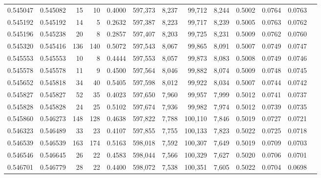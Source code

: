 \begin{tabular}{rrrrrrrrrrrrr}
0.545047 & 0.545082 &    15 &    10 &                                     0.4000 & 597,373 &   8,237 &  99,712 &   8,244 & 0.5002 & 0.0764 & 0.0763 \\
0.545192 & 0.545192 &    14 &     5 &                                     0.2632 & 597,387 &   8,223 &  99,717 &   8,239 & 0.5005 & 0.0763 & 0.0762 \\
0.545196 & 0.545238 &    20 &     8 &                                     0.2857 & 597,407 &   8,203 &  99,725 &   8,231 & 0.5009 & 0.0762 & 0.0760 \\
0.545320 & 0.545416 &   136 &   140 &                                     0.5072 & 597,543 &   8,067 &  99,865 &   8,091 & 0.5007 & 0.0749 & 0.0747 \\
0.545553 & 0.545553 &    10 &     8 &                                     0.4444 & 597,553 &   8,057 &  99,873 &   8,083 & 0.5008 & 0.0749 & 0.0746 \\
0.545578 & 0.545578 &    11 &     9 &                                     0.4500 & 597,564 &   8,046 &  99,882 &   8,074 & 0.5009 & 0.0748 & 0.0745 \\
0.545652 & 0.545818 &    34 &    40 &                                     0.5405 & 597,598 &   8,012 &  99,922 &   8,034 & 0.5007 & 0.0744 & 0.0742 \\
0.545827 & 0.545827 &    52 &    35 &                                     0.4023 & 597,650 &   7,960 &  99,957 &   7,999 & 0.5012 & 0.0741 & 0.0737 \\
0.545828 & 0.545828 &    24 &    25 &                                     0.5102 & 597,674 &   7,936 &  99,982 &   7,974 & 0.5012 & 0.0739 & 0.0735 \\
0.545860 & 0.546273 &   148 &   128 &                                     0.4638 & 597,822 &   7,788 & 100,110 &   7,846 & 0.5019 & 0.0727 & 0.0721 \\
0.546323 & 0.546489 &    33 &    23 &                                     0.4107 & 597,855 &   7,755 & 100,133 &   7,823 & 0.5022 & 0.0725 & 0.0718 \\
0.546539 & 0.546539 &   163 &   174 &                                     0.5163 & 598,018 &   7,592 & 100,307 &   7,649 & 0.5019 & 0.0709 & 0.0703 \\
0.546546 & 0.546645 &    26 &    22 &                                     0.4583 & 598,044 &   7,566 & 100,329 &   7,627 & 0.5020 & 0.0706 & 0.0701 \\
0.546701 & 0.546779 &    28 &    22 &                                     0.4400 & 598,072 &   7,538 & 100,351 &   7,605 & 0.5022 & 0.0704 & 0.0698 \\

\end{tabular}
